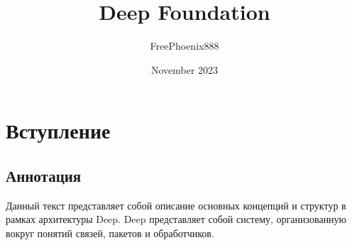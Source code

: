 \documentclass{article}
\title{Deep Foundation}
\author{FreePhoenix888}
\date{November 2023}
\begin{document}
\maketitle

\newpage %

\section{Вступление}
\subsection{Аннотация}

Данный текст представляет собой описание основных концепций и структур в рамках
архитектуры Deep. Deep представляет собой систему, организованную вокруг
понятий связей, пакетов и обработчиков.
\end{document}
